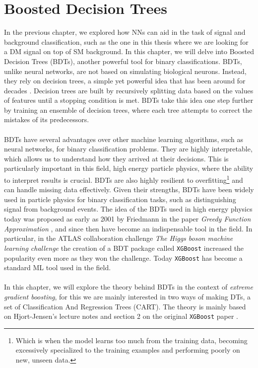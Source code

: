 \documentclass[12pt, a4paper]{book}
\begin{document}
\clearpage




\section{Boosted Decision Trees}
In the previous chapter, we explored how NNs can aid in the task of signal and background classification, such as the one in this thesis where we are looking for a DM signal on top of SM background. In this chapter, we will delve into Boosted Decision Trees (BDTs), 
another powerful tool for binary classifications. BDTs, unlike neural networks, are not based on simulating biological neurons. Instead, they rely on decision trees, a simple yet powerful idea that has been around for decades \cite{Morgan1963ProblemsIT, ID3_BDT}. 
Decision trees are built by recursively splitting data based on the values of features until a stopping condition is met. BDTs take this idea one step further by training an ensemble of decision trees, where each tree attempts to correct the mistakes of its predecessors.\\
\\BDTs have several advantages over other machine learning algorithms, such as neural networks, for binary classification problems. They are highly interpretable, which allows us to understand how they arrived at their decisions. This is particularly important in this field, 
high energy particle physics, where the ability to interpret results is crucial. BDTs are also highly resilient to overfitting\footnote{Which is when the model learns too much from the training data, becoming excessively specialized to the training examples and performing poorly on new, unseen data.} and can handle missing data effectively. Given their strengths, BDTs have been widely used in particle physics for binary classification tasks, 
such as distinguishing signal from background events. The idea of the BDTs used in high energy physics today was proposed as early as 2001 by Friedmann in the paper \textit{Greedy Function Approximation} \cite{BDT_Friedman}, and since then have become an indispensable tool in the field. 
In particular, in the ATLAS collaboration challenge \textit{The Higgs boson machine learning challenge} \cite{HiggsChallenge} the creation of a BDT package called \verb|XGBoost| \cite{XGBoost} increased the popularity even more as they won the challenge. 
Today \verb|XGBoost| has become a standard ML tool used in the field.\\
\\In this chapter, we will explore the theory behind BDTs in the context of \textit{extreme gradient boosting}, for this we are mainly interested in two ways of making DTs, a set of Classification And Regression Trees (CART). 
The theory is mainly based on Hjort-Jensen's lecture notes \cite{MORTYY4, MORTYY5} and section 2 on the original \verb|XGBoost| paper \cite{XGBoost}.
\newpage
\end{document}
